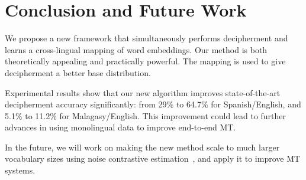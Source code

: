 \section{Conclusion and Future Work}


We propose a new framework that simultaneously performs decipherment and learns a cross-lingual mapping of word embeddings. Our method is both theoretically appealing and practically powerful. The mapping is used to give decipherment a better base distribution. 

Experimental results show that our new algorithm improves state-of-the-art decipherment accuracy significantly: from 29\% to 64.7\% for Spanish/English, and 5.1\% to 11.2\% for Malagasy/English. This improvement could lead to further advances in using monolingual data to improve end-to-end MT.

In the future, we will work on making the new method scale to much larger vocabulary sizes using noise contrastive estimation~\cite{gutmann2010noise}, and apply it to improve MT systems.